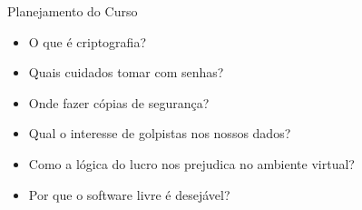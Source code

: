 \begin{frame}{Planejamento do Curso}
	\begin{itemize}
		\item O que é criptografia?
		\item Quais cuidados tomar com senhas?
		\item Onde fazer cópias de segurança?
		\item Qual o interesse de golpistas nos nossos dados?
		\item Como a lógica do lucro nos prejudica no ambiente virtual?
		\item Por que o software livre é desejável?
	\end{itemize}
\end{frame}
